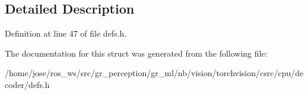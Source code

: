 \subsection{Detailed Description}


Definition at line 47 of file defs.\+h.



The documentation for this struct was generated from the following file\+:\begin{DoxyCompactItemize}
\item 
/home/jose/ros\+\_\+ws/src/gr\+\_\+perception/gr\+\_\+ml/nb/vision/torchvision/csrc/cpu/decoder/defs.\+h\end{DoxyCompactItemize}
